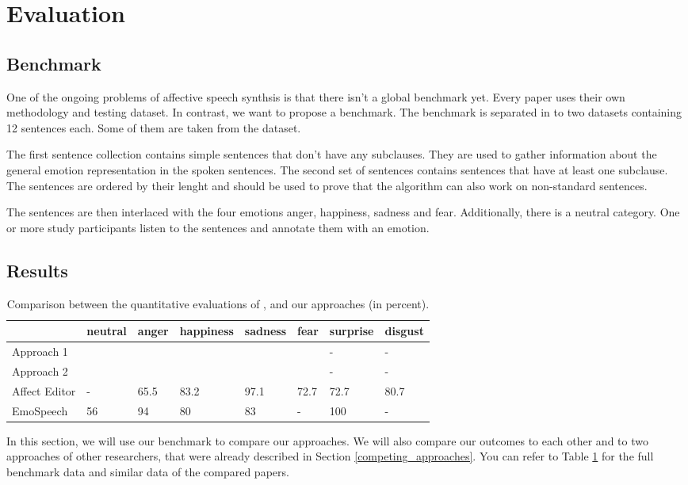 \documentclass[11pt]{article}
\begin{document}
\section{Evaluation}
\label{evaluation}

\subsection{Benchmark}
One of the ongoing problems of affective speech synthsis is that there isn't a global benchmark yet\cite{triantafyllopoulos_overview_2023}. Every paper uses their own methodology and testing dataset. In contrast, we want to propose a benchmark. The benchmark is separated in to two datasets containing 12 sentences each. Some of them are taken from the \cite{saravia-etal-2018-carer} dataset.

The first sentence collection contains simple sentences that don't have any subclauses. They are used to gather information about the general emotion representation in the spoken sentences. The second set of sentences contains sentences that have at least one subclause. The sentences are ordered by their lenght and should be used to prove that the algorithm can also work on non-standard sentences.

The sentences are then interlaced with the four emotions anger, happiness, sadness and fear. Additionally, there is a neutral category. One or more study participants listen to the sentences and annotate them with an emotion.


\subsection{Results}
\begin{table}[t]

\centering
\vspace{5px}
{
\begin{tabular}{|p{2cm}|p{1.5cm}|p{1.5cm}|p{1.5cm}|p{1.5cm}|p{1.5cm}|p{1.5cm}|p{1.5cm}|}
\hline
\rowcolor{mintgreen}&neutral&anger&happiness&sadness&fear&surprise&disgust\\
\hline
\cellcolor{gainsboro}Approach 1&&&&&&-&-\\
\hline
\cellcolor{gainsboro}Approach 2&&&&&&-&-\\
\hline
\hline
\cellcolor{gainsboro}Affect Editor& -&65.5&83.2&97.1&72.7&72.7&80.7\\
\hline
\cellcolor{gainsboro}EmoSpeech&56 &94&80 &83&-&100&-\\
\hline
\end{tabular}
}

\caption{Comparison between the quantitative evaluations of \cite{cahn_generation_2000}, \cite{diatlova_emospeech_2023} and our approaches (in percent).}
\label{Tabelle}
\end{table}
In this section, we will use our benchmark to compare our approaches. We will also compare our outcomes to each other and to two approaches of other researchers, that were already described in Section \ref{competing_approaches}. You can refer to Table \ref{Tabelle} for the full benchmark data and similar data of the compared papers.
\end{document}
